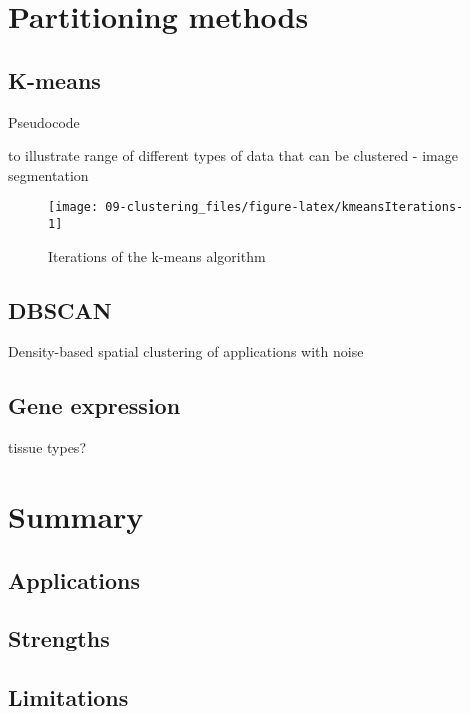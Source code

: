 \documentclass[]{book}
\theoremstyle{definition}
\theoremstyle{definition}
\theoremstyle{definition}
\theoremstyle{remark}
\begin{document}
\section{Partitioning methods}\label{partitioning-methods}

\subsection{K-means}\label{k-means}

Pseudocode

to illustrate range of different types of data that can be clustered -
image segmentation

\begin{figure}

{\centering \texttt{[image: 09-clustering\_files/figure-latex/kmeansIterations-1]} 

}

\caption{Iterations of the k-means algorithm}\label{fig:kmeansIterations}
\end{figure}

\subsection{DBSCAN}\label{dbscan}

Density-based spatial clustering of applications with noise

\subsection{Gene expression}\label{gene-expression}

tissue types?

\section{Summary}\label{summary}

\subsection{Applications}\label{applications}

\subsection{Strengths}\label{strengths}

\subsection{Limitations}\label{limitations}
\end{document}
